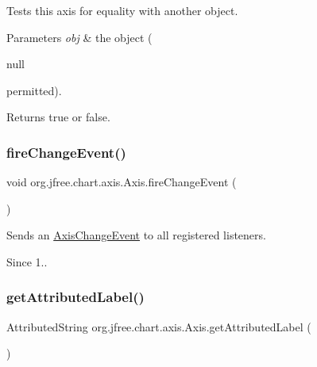 Tests this axis for equality with another object.


\begin{DoxyParams}{Parameters}
{\em obj} & the object (
\begin{DoxyCode}
null 
\end{DoxyCode}
 permitted).\\
\hline
\end{DoxyParams}
\begin{DoxyReturn}{Returns}
{\ttfamily true} or {\ttfamily false}. 
\end{DoxyReturn}
\mbox{\label{classorg_1_1jfree_1_1chart_1_1axis_1_1_axis_a6beeee0f30137736d5234cb1db19f0a7}} 
\subsubsection{\texorpdfstring{fire\+Change\+Event()}{fireChangeEvent()}}
{\footnotesize\ttfamily void org.\+jfree.\+chart.\+axis.\+Axis.\+fire\+Change\+Event (\begin{DoxyParamCaption}{ }\end{DoxyParamCaption})\hspace{0.3cm}{\ttfamily [protected]}}

Sends an \mbox{\hyperlink{}{Axis\+Change\+Event}} to all registered listeners.

\begin{DoxySince}{Since}
1.. 
\end{DoxySince}
\mbox{\label{classorg_1_1jfree_1_1chart_1_1axis_1_1_axis_a9edf528ad7712a2f53213f51054ea13c}} 
\subsubsection{\texorpdfstring{get\+Attributed\+Label()}{getAttributedLabel()}}
{\footnotesize\ttfamily Attributed\+String org.\+jfree.\+chart.\+axis.\+Axis.\+get\+Attributed\+Label (\begin{DoxyParamCaption}{ }\end{DoxyParamCaption})}

